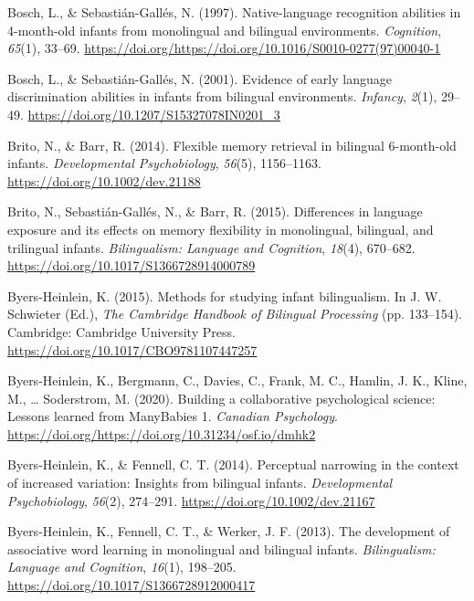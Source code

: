 \documentclass[
  english,
  ,man,floatsintext]{apa6}
\begin{document}
\leavevmode\hypertarget{ref-bosch_1997}{}%
Bosch, L., \& Sebastián-Gallés, N. (1997). Native-language recognition abilities in 4-month-old infants from monolingual and bilingual environments. \emph{Cognition}, \emph{65}(1), 33--69. \url{https://doi.org/https://doi.org/10.1016/S0010-0277(97)00040-1}

\leavevmode\hypertarget{ref-bosch_2001}{}%
Bosch, L., \& Sebastián-Gallés, N. (2001). Evidence of early language discrimination abilities in infants from bilingual environments. \emph{Infancy}, \emph{2}(1), 29--49. \url{https://doi.org/10.1207/S15327078IN0201_3}

\leavevmode\hypertarget{ref-brito_2014}{}%
Brito, N., \& Barr, R. (2014). Flexible memory retrieval in bilingual 6-month-old infants. \emph{Developmental Psychobiology}, \emph{56}(5), 1156--1163. \url{https://doi.org/10.1002/dev.21188}

\leavevmode\hypertarget{ref-brito_2015}{}%
Brito, N., Sebastián-Gallés, N., \& Barr, R. (2015). Differences in language exposure and its effects on memory flexibility in monolingual, bilingual, and trilingual infants. \emph{Bilingualism: Language and Cognition}, \emph{18}(4), 670--682. \url{https://doi.org/10.1017/S1366728914000789}

\leavevmode\hypertarget{ref-byers_heinlein_2015}{}%
Byers-Heinlein, K. (2015). Methods for studying infant bilingualism. In J. W. Schwieter (Ed.), \emph{The Cambridge Handbook of Bilingual Processing} (pp. 133--154). Cambridge: Cambridge University Press. \url{https://doi.org/10.1017/CBO9781107447257}

\leavevmode\hypertarget{ref-byers_heinlein_et_al_2019}{}%
Byers-Heinlein, K., Bergmann, C., Davies, C., Frank, M. C., Hamlin, J. K., Kline, M., \ldots{} Soderstrom, M. (2020). Building a collaborative psychological science: Lessons learned from ManyBabies 1. \emph{Canadian Psychology}. \url{https://doi.org/https://doi.org/10.31234/osf.io/dmhk2}

\leavevmode\hypertarget{ref-byers_heinlein_2014}{}%
Byers-Heinlein, K., \& Fennell, C. T. (2014). Perceptual narrowing in the context of increased variation: Insights from bilingual infants. \emph{Developmental Psychobiology}, \emph{56}(2), 274--291. \url{https://doi.org/10.1002/dev.21167}

\leavevmode\hypertarget{ref-byers_heinlein_2013}{}%
Byers-Heinlein, K., Fennell, C. T., \& Werker, J. F. (2013). The development of associative word learning in monolingual and bilingual infants. \emph{Bilingualism: Language and Cognition}, \emph{16}(1), 198--205. \url{https://doi.org/10.1017/S1366728912000417}
\end{document}
